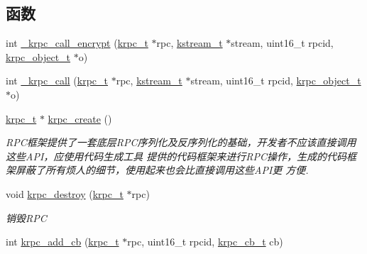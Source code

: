\subsection*{函数}
\begin{DoxyCompactItemize}
\item 
int \hyperlink{a00093_a81438b66394a3d6bf42c1971fefeb67c_a81438b66394a3d6bf42c1971fefeb67c}{\+\_\+krpc\+\_\+call\+\_\+encrypt} (\hyperlink{a00056_a1e414ac6f6de24462ccf81e10f63428d_a1e414ac6f6de24462ccf81e10f63428d}{krpc\+\_\+t} $\ast$rpc, \hyperlink{a00056_acc208c4c40c875eebbfef88f00fffacf_acc208c4c40c875eebbfef88f00fffacf}{kstream\+\_\+t} $\ast$stream, uint16\+\_\+t rpcid, \hyperlink{a00056_a9c07dfc8c3b965f75b09f82fdb1bbb1e_a9c07dfc8c3b965f75b09f82fdb1bbb1e}{krpc\+\_\+object\+\_\+t} $\ast$o)
\item 
int \hyperlink{a00093_a8e2ea426099ea032432a9aeb24088cf0_a8e2ea426099ea032432a9aeb24088cf0}{\+\_\+krpc\+\_\+call} (\hyperlink{a00056_a1e414ac6f6de24462ccf81e10f63428d_a1e414ac6f6de24462ccf81e10f63428d}{krpc\+\_\+t} $\ast$rpc, \hyperlink{a00056_acc208c4c40c875eebbfef88f00fffacf_acc208c4c40c875eebbfef88f00fffacf}{kstream\+\_\+t} $\ast$stream, uint16\+\_\+t rpcid, \hyperlink{a00056_a9c07dfc8c3b965f75b09f82fdb1bbb1e_a9c07dfc8c3b965f75b09f82fdb1bbb1e}{krpc\+\_\+object\+\_\+t} $\ast$o)
\item 
\hyperlink{a00056_a1e414ac6f6de24462ccf81e10f63428d_a1e414ac6f6de24462ccf81e10f63428d}{krpc\+\_\+t} $\ast$ \hyperlink{a00093_a5d55f838d222f44965d99eac9a0381c1_a5d55f838d222f44965d99eac9a0381c1}{krpc\+\_\+create} ()
\begin{DoxyCompactList}\small\item\em R\+P\+C框架提供了一套底层\+R\+P\+C序列化及反序列化的基础，开发者不应该直接调用这些\+A\+P\+I，应使用代码生成工具 提供的代码框架来进行\+R\+P\+C操作，生成的代码框架屏蔽了所有烦人的细节，使用起来也会比直接调用这些\+A\+P\+I更 方便. \end{DoxyCompactList}\item 
void \hyperlink{a00093_ab07c8ccf1abc99b85f455a2f4280ac76_ab07c8ccf1abc99b85f455a2f4280ac76}{krpc\+\_\+destroy} (\hyperlink{a00056_a1e414ac6f6de24462ccf81e10f63428d_a1e414ac6f6de24462ccf81e10f63428d}{krpc\+\_\+t} $\ast$rpc)
\begin{DoxyCompactList}\small\item\em 销毁\+R\+P\+C \end{DoxyCompactList}\item 
int \hyperlink{a00093_aa12a9874d2b0308994c3fa651cdbbd61_aa12a9874d2b0308994c3fa651cdbbd61}{krpc\+\_\+add\+\_\+cb} (\hyperlink{a00056_a1e414ac6f6de24462ccf81e10f63428d_a1e414ac6f6de24462ccf81e10f63428d}{krpc\+\_\+t} $\ast$rpc, uint16\+\_\+t rpcid, \hyperlink{a00056_a06bb708c1b97445d3a5d0c1b32ad2ab6_a06bb708c1b97445d3a5d0c1b32ad2ab6}{krpc\+\_\+cb\+\_\+t} cb)

\end{DoxyCompactItemize}
